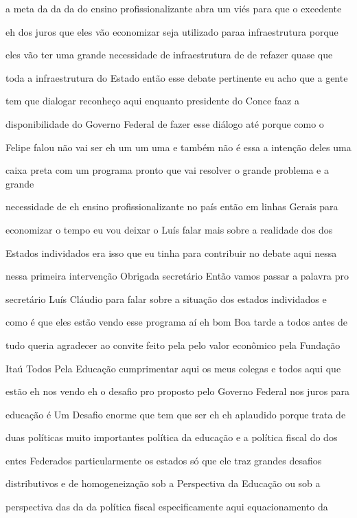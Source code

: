 \documentclass[a4paper,12pt]{article}
\begin{document}
a meta da da da do ensino profissionalizante abra um viés para que o excedente

eh dos juros que eles vão economizar seja utilizado paraa infraestrutura porque

eles vão ter uma grande necessidade de infraestrutura de de refazer quase que

toda a infraestrutura do Estado então esse debate pertinente eu acho que a gente

tem que dialogar reconheço aqui enquanto presidente do Conce faaz a

disponibilidade do Governo Federal de fazer esse diálogo até porque como o

Felipe falou não vai ser eh um um uma e também não é essa a intenção deles uma

caixa preta com um programa pronto que vai resolver o grande problema e a grande

necessidade de eh ensino profissionalizante no país então em linhas Gerais para

economizar o tempo eu vou deixar o Luís falar mais sobre a realidade dos dos

Estados individados era isso que eu tinha para contribuir no debate aqui nessa

nessa primeira intervenção Obrigada secretário Então vamos passar a palavra pro

secretário Luís Cláudio para falar sobre a situação dos estados individados e

como é que eles estão vendo esse programa aí eh bom Boa tarde a todos antes de

tudo queria agradecer ao convite feito pela pelo valor econômico pela Fundação

Itaú Todos Pela Educação cumprimentar aqui os meus colegas e todos aqui que

estão eh nos vendo eh o desafio pro proposto pelo Governo Federal nos juros para

educação é Um Desafio enorme que tem que ser eh eh aplaudido porque trata de

duas políticas muito importantes política da educação e a política fiscal do dos

entes Federados particularmente os estados só que ele traz grandes desafios

distributivos e de homogeneização sob a Perspectiva da Educação ou sob a

perspectiva das da da política fiscal especificamente aqui equacionamento da
\end{document}
